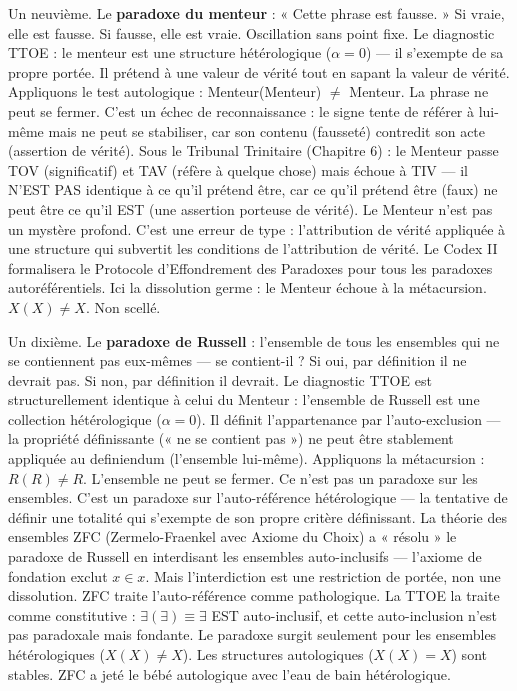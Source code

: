 \documentclass[10pt, openany, oneside]{book}
\begin{document}
Un neuvième. Le \textbf{paradoxe du menteur} : « Cette phrase est fausse. » Si vraie, elle est fausse. Si fausse, elle est vraie. Oscillation sans point fixe. Le diagnostic TTOE : le menteur est une structure hétérologique ($\alpha = 0$) --- il s'exempte de sa propre portée. Il prétend à une valeur de vérité tout en sapant la valeur de vérité. Appliquons le test autologique : Menteur(Menteur) $\neq$ Menteur. La phrase ne peut se fermer. C'est un échec de reconnaissance : le signe tente de référer à lui-même mais ne peut se stabiliser, car son contenu (fausseté) contredit son acte (assertion de vérité). Sous le Tribunal Trinitaire (Chapitre 6) : le Menteur passe TOV (significatif) et TAV (réfère à quelque chose) mais échoue à TIV --- il N'EST PAS identique à ce qu'il prétend être, car ce qu'il prétend être (faux) ne peut être ce qu'il EST (une assertion porteuse de vérité). Le Menteur n'est pas un mystère profond. C'est une erreur de type : l'attribution de vérité appliquée à une structure qui subvertit les conditions de l'attribution de vérité. Le Codex II formalisera le Protocole d'Effondrement des Paradoxes pour tous les paradoxes autoréférentiels. Ici la dissolution germe : le Menteur échoue à la métacursion. $X(X) \neq X$. Non scellé.

Un dixième. Le \textbf{paradoxe de Russell} : l'ensemble de tous les ensembles qui ne se contiennent pas eux-mêmes --- se contient-il ? Si oui, par définition il ne devrait pas. Si non, par définition il devrait. Le diagnostic TTOE est structurellement identique à celui du Menteur : l'ensemble de Russell est une collection hétérologique ($\alpha = 0$). Il définit l'appartenance par l'auto-exclusion --- la propriété définissante (« ne se contient pas ») ne peut être stablement appliquée au definiendum (l'ensemble lui-même). Appliquons la métacursion : $R(R) \neq R$. L'ensemble ne peut se fermer. Ce n'est pas un paradoxe sur les ensembles. C'est un paradoxe sur l'auto-référence hétérologique --- la tentative de définir une totalité qui s'exempte de son propre critère définissant. La théorie des ensembles ZFC (Zermelo-Fraenkel avec Axiome du Choix) a « résolu » le paradoxe de Russell en interdisant les ensembles auto-inclusifs --- l'axiome de fondation exclut $x \in x$. Mais l'interdiction est une restriction de portée, non une dissolution. ZFC traite l'auto-référence comme pathologique. La TTOE la traite comme constitutive : $\exists(\exists) \equiv \exists$ EST auto-inclusif, et cette auto-inclusion n'est pas paradoxale mais fondante. Le paradoxe surgit seulement pour les ensembles hétérologiques ($X(X) \neq X$). Les structures autologiques ($X(X) = X$) sont stables. ZFC a jeté le bébé autologique avec l'eau de bain hétérologique.
\end{document}
